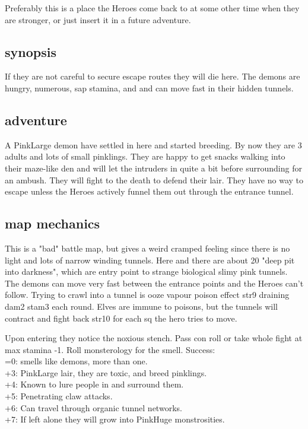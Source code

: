 Preferably this is a place the Heroes come back to at some other time when they are stronger, or just insert it in a future adventure.


\subsection*{synopsis}
If they are not careful to secure escape routes they will die here. The demons are hungry, numerous, sap stamina, and and can move fast in their hidden tunnels.


\subsection*{adventure}
A PinkLarge demon have settled in here and started breeding. By now they are 3 adults and lots of small pinklings. They are happy to get snacks walking into their maze-like den and will let the intruders in quite a bit before surrounding for an ambush. They will fight to the death to defend their lair. They have no way to escape unless the Heroes actively funnel them out through the entrance tunnel.


\subsection*{map mechanics}
This is a "bad" battle map, but gives a weird cramped feeling since there is no light and lots of narrow winding tunnels. Here and there are about 20 "deep pit into darkness", which are entry point to strange biological slimy pink tunnels. The demons can move very fast between the entrance points and the Heroes can't follow. Trying to crawl into a tunnel is ooze vapour poison effect str9 draining dam2 stam3 each round. Elves are immune to poisons, but the tunnels will contract and fight back str10 for each sq the hero tries to move.

Upon entering they notice the noxious stench. Pass con roll or take whole fight at max stamina -1. Roll monsterology for the smell. Success:\\
=0: smells like demons, more than one.\\
+3: PinkLarge lair, they are toxic, and breed pinklings.\\
+4: Known to lure people in and surround them.\\
+5: Penetrating claw attacks.\\
+6: Can travel through organic tunnel networks.\\
+7: If left alone they will grow into PinkHuge monstrosities.


